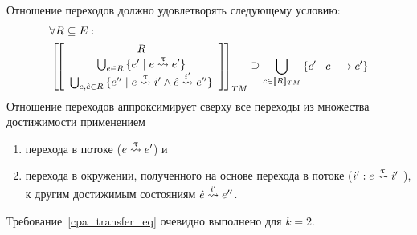 Отношение переходов должно удовлетворять следующему условию:
\begin{equation}
\label{transfer_tm_ir}
\begin{aligned}
& \forall R \subseteq E:\\
& 
\left[\!\left[
\begin{array}{c}
R\\
\bigcup_{e\in R}{\{e' \mid e \stackrel{\uptau}{\leadsto} e'\}}\\
\bigcup_{e,\hat e\in R}{\{e'' \mid e \stackrel{\uptau}{\leadsto} i' \land \hat e \stackrel{i'}{\leadsto} e''\}}\\
\end{array}
\right]\!\right]_{TM}
\supseteq \bigcup_{c \in [\![ R ]\!]_{TM}}{\{c' \mid c \longrightarrow c'\}}
\end{aligned}
\end{equation}
Отношение переходов аппроксимирует сверху все переходы из множества достижимости применением
\begin{enumerate}
\item перехода в потоке ($e \stackrel{\uptau}{\leadsto} e'$) и 
\item перехода в окружении, полученного на основе перехода в потоке ($i': e \stackrel{\uptau}{\leadsto} i'$ ), к другим достижимым состояниям $\hat e \stackrel{i'}{\leadsto} e''$.
\end{enumerate}

Требование~\ref{cpa_transfer_eq} очевидно выполнено для $k = 2$.

